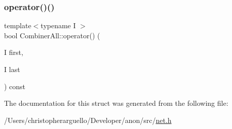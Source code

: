 \subsubsection{\texorpdfstring{operator()()}{operator()()}}
{\footnotesize\ttfamily template$<$typename I $>$ \\
bool Combiner\+All\+::operator() (\begin{DoxyParamCaption}\item[{I}]{first,  }\item[{I}]{last }\end{DoxyParamCaption}) const\hspace{0.3cm}{\ttfamily [inline]}}



The documentation for this struct was generated from the following file\+:\begin{DoxyCompactItemize}
\item 
/\+Users/christopherarguello/\+Developer/anon/src/\mbox{\hyperlink{net_8h}{net.\+h}}\end{DoxyCompactItemize}
